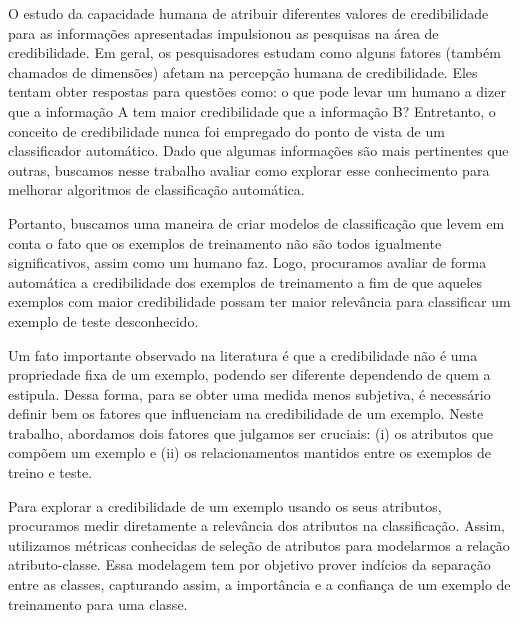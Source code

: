 O estudo da capacidade humana de atribuir diferentes valores de credibilidade para as informações apresentadas impulsionou as pesquisas na área de credibilidade. 
Em geral, os pesquisadores estudam como alguns fatores (também chamados de dimensões) afetam na percepção humana de credibilidade.
Eles tentam obter respostas para questões como: o que pode levar um humano a dizer que a informação A tem maior credibilidade que a informação B?
Entretanto, o conceito de credibilidade nunca foi empregado do ponto de vista de um classificador automático. Dado que algumas informações são mais pertinentes que outras, buscamos nesse trabalho avaliar como explorar esse conhecimento para melhorar algoritmos de classificação automática.

Portanto, buscamos uma maneira de criar modelos de classificação que levem em conta o fato que os exemplos de treinamento não são todos igualmente significativos, assim como um humano faz.
Logo, procuramos avaliar de forma automática a credibilidade dos exemplos de treinamento a fim de que aqueles exemplos com maior credibilidade possam ter maior relevância para classificar um exemplo de teste desconhecido.

Um fato importante observado na literatura é que a credibilidade não é uma propriedade fixa de um exemplo, podendo ser diferente dependendo de quem a estipula. Dessa forma, para se obter uma medida menos subjetiva, é necessário definir bem os fatores que influenciam na credibilidade de um exemplo. Neste trabalho, abordamos dois fatores que julgamos ser cruciais: (i) os atributos que compõem um exemplo e (ii) os relacionamentos mantidos entre os exemplos de treino e teste.

Para explorar a credibilidade de um exemplo usando os seus atributos, procuramos medir diretamente a relevância dos atributos na classificação. Assim, utilizamos métricas conhecidas de seleção de atributos para modelarmos a relação atributo-classe. Essa modelagem tem por objetivo prover indícios da separação entre as classes, capturando assim, a importância e a confiança de um exemplo de treinamento para uma classe.

